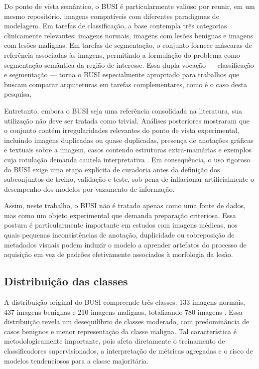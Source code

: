 \documentclass[tcc,capa]{texufpel}
\begin{document}
Do ponto de vista semântico, o BUSI é particularmente valioso por reunir, em um mesmo repositório, imagens compatíveis com diferentes paradigmas de modelagem. Em tarefas de classificação, a base contempla três categorias clinicamente relevantes: imagens normais, imagens com lesões benignas e imagens com lesões malignas. Em tarefas de segmentação, o conjunto fornece máscaras de referência associadas às imagens, permitindo a formulação do problema como segmentação semântica da região de interesse. Essa dupla vocação --- classificação e segmentação --- torna o BUSI especialmente apropriado para trabalhos que buscam comparar arquiteturas em tarefas complementares, como é o caso desta pesquisa.

Entretanto, embora o BUSI seja uma referência consolidada na literatura, sua utilização não deve ser tratada como trivial. Análises posteriores mostraram que o conjunto contém irregularidades relevantes do ponto de vista experimental, incluindo imagens duplicadas ou quase duplicadas, presença de anotações gráficas e textuais sobre a imagem, casos contendo estruturas extra-mamárias e exemplos cuja rotulação demanda cautela interpretativa \cite{Pawlowska2023,AumenteMaestro2025}. Em consequência, o uso rigoroso do BUSI exige uma etapa explícita de curadoria antes da definição dos subconjuntos de treino, validação e teste, sob pena de inflacionar artificialmente o desempenho dos modelos por vazamento de informação.

Assim, neste trabalho, o BUSI não é tratado apenas como uma fonte de dados, mas como um objeto experimental que demanda preparação criteriosa. Essa postura é particularmente importante em estudos com imagens médicas, nos quais pequenas inconsistências de anotação, duplicidade ou sobreposição de metadados visuais podem induzir o modelo a aprender artefatos do processo de aquisição em vez de padrões efetivamente associados à morfologia da lesão.

\subsection{Distribuição das classes}

A distribuição original do BUSI compreende três classes: 133 imagens normais, 437 imagens benignas e 210 imagens malignas, totalizando 780 imagens \cite{AlDhabyani2020,turn956269search3}. Essa distribuição revela um desequilíbrio de classes moderado, com predominância de casos benignos e menor representação da classe maligna. Tal característica é metodologicamente importante, pois afeta diretamente o treinamento de classificadores supervisionados, a interpretação de métricas agregadas e o risco de modelos tendenciosos para a classe majoritária.
\end{document}
